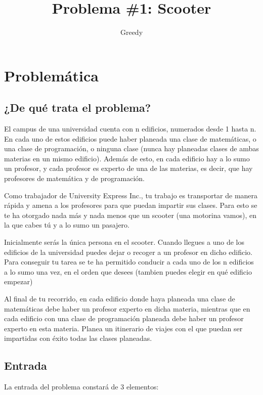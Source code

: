 \documentclass[11pt]{article}
\author{
    Greedy
    }
\title{Problema \#1: Scooter}
\begin{document}
    \maketitle
    \newpage

    \section{Problemática}
    \subsection{¿De qué trata el problema?}
    El campus de una universidad cuenta con n edificios, numerados desde 1 hasta n. En cada uno de estos
    edificios puede haber planeada una clase de matemáticas, o una clase de programación, o ninguna clase
    (nunca hay planeadas clases de ambas materias en un mismo edificio). Además de esto, en cada edificio
    hay a lo sumo un profesor, y cada profesor es experto de una de las materias, es decir, que hay profesores
    de matemática y de programación.
    
    Como trabajador de University Express Inc., tu trabajo es transportar de manera rápida y amena  a los
    profesores para que puedan impartir sus clases. Para esto se te ha otorgado nada más y nada menos que un
    scooter (una motorina vamos), en la que cabes tú y a lo sumo un pasajero.
    
    Inicialmente serás la única persona en el scooter. Cuando llegues a uno de los edificios de la universidad
    puedes dejar o recoger a un profesor en dicho edificio. Para conseguir tu tarea se te ha permitido conducir
    a cada uno de los n edificios a lo sumo una vez, en el orden que desees (tambien puedes elegir en qué edificio
    empezar)

    Al final de tu recorrido, en cada edificio donde haya planeada una clase de matemáticas debe haber un
    profesor experto en dicha materia, mientras que en cada edificio con una clase de programación planeada
    debe haber un profesor experto en esta materia. Planea un itinerario de viajes con el que puedan ser
    impartidas con éxito todas las clases planeadas.

    \subsection{Entrada}
    La entrada del problema constará de 3 elementos:
\end{document}
